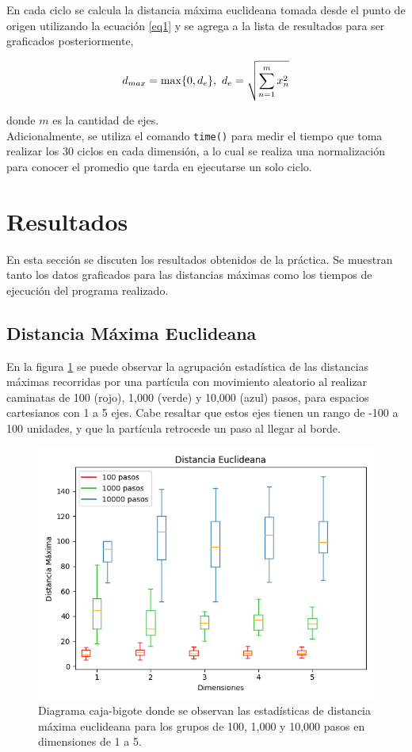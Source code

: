 \documentclass{article}
\begin{document}
En cada ciclo se calcula la distancia m\'axima euclideana tomada desde el punto de origen utilizando la ecuaci\'on \eqref{eq1} y se agrega a la lista de resultados para ser graficados posteriormente,

\begin{equation}
    d_{max} = \max\{0, d_{e}\},\ d_{e} = \sqrt{\sum_{n=1}^m x_{n}^{2}}\\ \label{eq1}
\end{equation}

donde $m$ es la cantidad de ejes.\\

Adicionalmente, se utiliza el comando \texttt{time()} para medir el tiempo que toma realizar los 30 ciclos en cada dimensi\'on, a lo cual se realiza una normalizaci\'on para conocer el promedio que tarda en ejecutarse un solo ciclo.

\section{Resultados}
En esta secci\'on se discuten los resultados obtenidos de la pr\'actica. Se muestran tanto los datos graficados para las distancias m\'aximas como los tiempos de ejecuci\'on del programa realizado.

\subsection{Distancia M\'axima Euclideana}
En la figura \ref{figura1} se puede observar la agrupaci\'on estad\'istica de las distancias m\'aximas recorridas por una part\'icula con movimiento aleatorio al realizar caminatas de 100 (rojo), 1,000 (verde) y 10,000 (azul) pasos, para espacios cartesianos con 1 a 5 ejes. Cabe resaltar que estos ejes tienen un rango de -100 a 100 unidades, y que la part\'icula retrocede un paso al llegar al borde.

\begin{figure}[h]
    \centering
    \includegraphics[width=140mm]{DistanciaEucl.png}
    \caption{Diagrama caja-bigote donde se observan las estad\'isticas de distancia m\'axima euclideana para los grupos de 100, 1,000 y 10,000 pasos en dimensiones de 1 a 5.}
    \label{figura1}
\end{figure}
\end{document}
